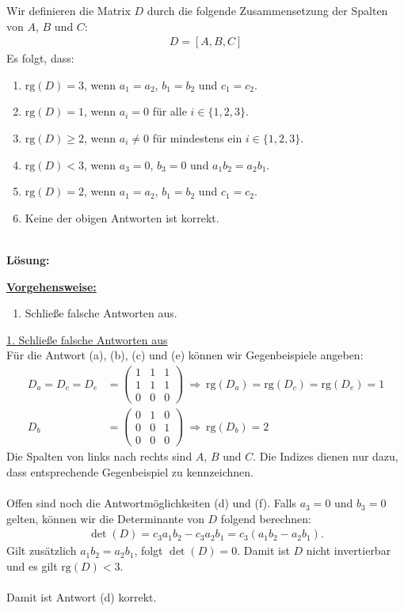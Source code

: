 Wir definieren die Matrix $D$ durch die folgende Zusammensetzung der Spalten von $A$, $B$ und $C$:
\begin{align*}
	D = [A,B,C]
\end{align*}
Es folgt, dass:
\renewcommand{\labelenumi}{(\alph{enumi})}
\begin{enumerate}
	\item 
	$ \mathrm{rg}(D) = 3 $, wenn $a_1 = a_2$, $b_1 = b_2$ und $c_1 = c_2$.
	\item
	$ \mathrm{rg}(D) = 1 $, wenn $ a_i = 0 $ für alle $ i \in \{1,2,3\} $.
	\item
	$ \mathrm{rg}(D) \geq  2 $, wenn $ a_i \neq 0 $ für mindestens ein $ i \in \{1,2,3\} $.
	\item
	$ \mathrm{rg}(D) < 3 $, wenn $a_3 = 0$, $b_3 = 0$ und $a_1 b_2 = a_2 b_1$. 
	\item
	$ \mathrm{rg}(D) = 2 $, wenn $a_1 = a_2$, $b_1 = b_2$ und $c_1 = c_2$.
	\item 
	Keine der obigen Antworten ist korrekt.
\end{enumerate}
\ \\
\textbf{Lösung:}
\begin{mdframed}
\underline{\textbf{Vorgehensweise:}}
\renewcommand{\labelenumi}{\theenumi.}
\begin{enumerate}
\item Schließe falsche Antworten aus.
\end{enumerate}
\end{mdframed}

\underline{1. Schließe falsche Antworten aus}\\
Für die Antwort (a), (b), (c) und (e) können wir Gegenbeispiele angeben:
\begin{align*}
	D_a = D_c = D_e
	&=
	\begin{pmatrix}
		1 & 1  & 1\\
		1 & 1 & 1\\
		0 & 0 & 0
	\end{pmatrix}
	\ \Rightarrow \
	\mathrm{rg}(D_a) = \mathrm{rg}(D_c) = \mathrm{rg}(D_e) = 1\\
	D_b
	&=
	\begin{pmatrix}
		0 & 1  & 0 \\
		0 & 0 & 1\\
		0 & 0 & 0
	\end{pmatrix}
	\ \Rightarrow \
	\mathrm{rg}(D_b) = 2
\end{align*}
Die Spalten von links nach rechts sind $A$, $B$ und $C$. Die Indizes dienen nur dazu, dass entsprechende Gegenbeispiel zu kennzeichnen.\\
\\
Offen sind noch die Antwortmöglichkeiten (d) und (f). 
Falls $a_3 = 0 $ und $b_3 = 0 $ gelten, können wir die Determinante von $D$ folgend berechnen:
\begin{align*}
	\det(D) = c_3 a_1 b_2 - c_3 a_2 b_1
	= c_3 ( a_1 b_2 - a_2 b_1).
\end{align*}
Gilt zusätzlich $a_1 b_2 = a_2 b_1$, folgt $\det(D) = 0$. Damit ist $D$ nicht invertierbar und es gilt $\mathrm{rg}(D) < 3$.\\
\\
Damit ist Antwort (d) korrekt.



